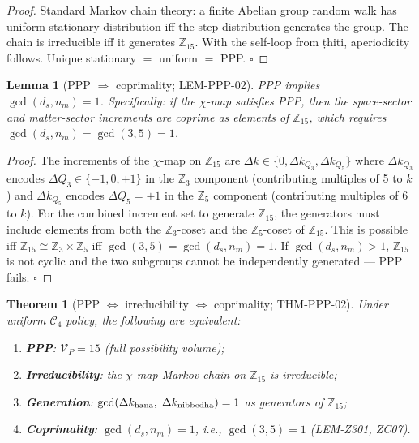 \documentclass[12pt, a4paper]{article}
\newtheorem{theorem}{Theorem}[section]
\newtheorem{lemma}{Lemma}[section]
\begin{document}
\begin{proof}
Standard Markov chain theory: a finite Abelian group random walk
has uniform stationary distribution iff the step distribution
generates the group. The chain is irreducible iff it generates
$\mathbb{Z}_{15}$. With the self-loop from ṭhiti, aperiodicity
follows. Unique stationary $=$ uniform $=$ PPP. \hfill$\square$
\end{proof}

\begin{lemma}[PPP $\Rightarrow$ coprimality; LEM-PPP-02]
\label{lem:ppp-coprime}
PPP implies $\gcd(d_s, n_m) = 1$. Specifically: if the
$\chi$-map satisfies PPP, then the space-sector and matter-sector
increments are coprime as elements of $\mathbb{Z}_{15}$, which
requires $\gcd(d_s, n_m) = \gcd(3,5) = 1$.
\end{lemma}

\begin{proof}
The increments of the $\chi$-map on $\mathbb{Z}_{15}$ are
$\Delta k \in \{0, \Delta k_{Q_3}, \Delta k_{Q_5}\}$ where
$\Delta k_{Q_3}$ encodes $\Delta Q_3 \in \{-1, 0, +1\}$ in the
$\mathbb{Z}_3$ component (contributing multiples of 5 to $k$)
and $\Delta k_{Q_5}$ encodes $\Delta Q_5 = +1$ in the $\mathbb{Z}_5$
component (contributing multiples of 6 to $k$). For the combined
increment set to generate $\mathbb{Z}_{15}$, the generators must
include elements from both the $\mathbb{Z}_3$-coset and the
$\mathbb{Z}_5$-coset of $\mathbb{Z}_{15}$. This is possible iff
$\mathbb{Z}_{15} \cong \mathbb{Z}_3 \times \mathbb{Z}_5$ iff
$\gcd(3,5) = \gcd(d_s, n_m) = 1$. If $\gcd(d_s, n_m) > 1$,
$\mathbb{Z}_{15}$ is not cyclic and the two subgroups cannot be
independently generated --- PPP fails. \hfill$\square$
\end{proof}

\begin{theorem}[PPP $\Leftrightarrow$ irreducibility $\Leftrightarrow$
  coprimality; THM-PPP-02]
\label{thm:PPP02}
Under uniform $\mathcal{C}_4$ policy, the following are equivalent:
\begin{enumerate}[leftmargin=*, label=(\roman*), noitemsep]
  \item \textbf{PPP}: $\mathcal{V}_P = 15$
    (full possibility volume);
  \item \textbf{Irreducibility}: the $\chi$-map Markov chain on
    $\mathbb{Z}_{15}$ is irreducible;
  \item \textbf{Generation}: $\gcd(\Delta k_{\rm hana},\;
    \Delta k_{\rm nibbedha}) = 1$ as generators of $\mathbb{Z}_{15}$;
  \item \textbf{Coprimality}: $\gcd(d_s, n_m) = 1$, i.e.,
    $\gcd(3, 5) = 1$ (LEM-Z301, ZC07).
\end{enumerate}
\end{theorem}
\end{document}
